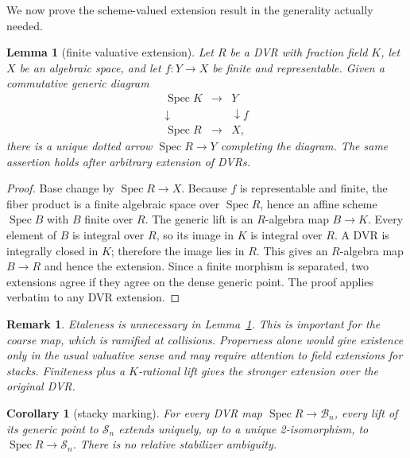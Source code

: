 \documentclass[11pt]{article}
\newtheorem{lemma}[theorem]{Lemma}
\newtheorem{corollary}[theorem]{Corollary}
\newtheorem{remark}[theorem]{Remark}
\newcommand{\Spec}{\operatorname{Spec}}
\begin{document}
We now prove the scheme-valued extension result in the generality actually
needed.

\begin{lemma}[finite valuative extension]\label{lem:finite-dvr}
Let $R$ be a DVR with fraction field $K$, let $X$ be an algebraic space, and
let $f:Y\to X$ be finite and representable.  Given a commutative generic
diagram
\[
\begin{array}{ccc}
 \Spec K&\longrightarrow&Y\\
 \downarrow&&\downarrow f\\
 \Spec R&\longrightarrow&X,
\end{array}                                                          \tag{5.1}
\]
there is a unique dotted arrow $\Spec R\to Y$ completing the diagram.
The same assertion holds after arbitrary extension of DVRs.
\end{lemma}

\begin{proof}
Base change by $\Spec R\to X$.  Because $f$ is representable and finite, the
fiber product is a finite algebraic space over $\Spec R$, hence an affine
scheme $\Spec B$ with $B$ finite over $R$.  The generic lift is an
$R$-algebra map $B\to K$.  Every element of $B$ is integral over $R$, so its
image in $K$ is integral over $R$.  A DVR is integrally closed in $K$;
therefore the image lies in $R$.  This gives an $R$-algebra map $B\to R$ and
hence the extension.  Since a finite morphism is separated, two extensions
agree if they agree on the dense generic point.  The proof applies verbatim
to any DVR extension.
\end{proof}

\begin{remark}
Etaleness is unnecessary in Lemma~\ref{lem:finite-dvr}.  This is important
for the coarse map, which is ramified at collisions.  Properness alone would
give existence only in the usual valuative sense and may require attention
to field extensions for stacks.  Finiteness plus a $K$-rational lift gives
the stronger extension over the original DVR.
\end{remark}

\begin{corollary}[stacky marking]\label{cor:stack-dvr}
For every DVR map $\Spec R\to\mathscr B_n$, every lift of its generic point
to $\mathscr S_n$ extends uniquely, up to a unique 2-isomorphism, to
$\Spec R\to\mathscr S_n$.  There is no relative stabilizer ambiguity.
\end{corollary}
\end{document}
